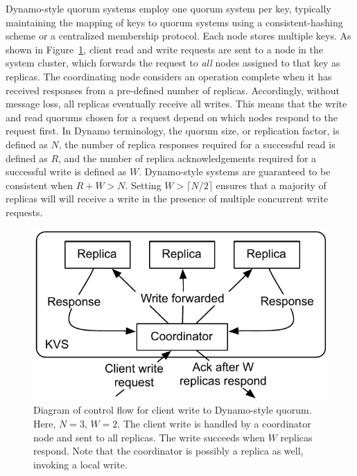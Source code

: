 \documentclass{vldb}
\begin{document}
Dynamo-style quorum systems employ one quorum system per key,
typically maintaining the mapping of keys to quorum systems using a
consistent-hashing scheme or a centralized membership protocol. Each
node stores multiple keys.  As shown in
Figure~\ref{fig:dynamo-quorum}, client read and write requests are
sent to a node in the system cluster, which forwards the request to
\textit{all} nodes assigned to that key as replicas.  The coordinating
node considers an operation complete when it has received responses
from a pre-defined number of replicas.  Accordingly, without message
loss, all replicas eventually receive all writes.  This means that the
write and read quorums chosen for a request depend on which nodes
respond to the request first.  In Dynamo terminology, the quorum size,
or replication factor, is defined as $N$, the number of replica
responses required for a successful read is defined as $R$, and the
number of replica acknowledgements required for a successful write is
defined as $W$. Dynamo-style systems are guaranteed to be consistent
when $R+W > N$.  Setting $W>\lceil N/2 \rceil$ ensures that a majority
of replicas will will receive a write in the presence of multiple
concurrent write requests.

\begin{figure}
\centering
\includegraphics[width=.85\columnwidth]{figs/dynamo-quorum.pdf}
\vspace{-8pt}
\caption{Diagram of control flow for client write to Dynamo-style
  quorum.  Here, $N=3$, $W=2$. The client write is handled by a
  coordinator node and sent to all replicas. The write succeeds when
  $W$ replicas respond.  Note that the coordinator is possibly a
  replica as well, invoking a local write.}
\vspace{-12pt}
\label{fig:dynamo-quorum}
\end{figure}
\end{document}
